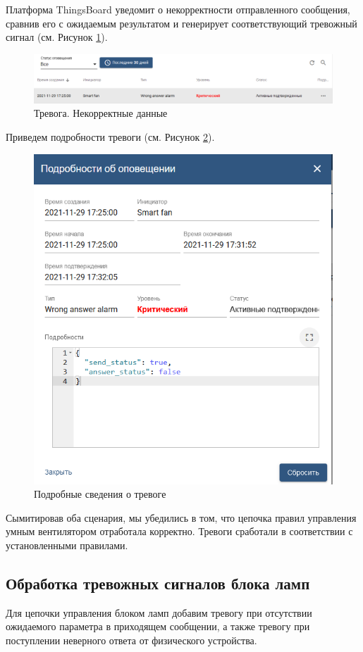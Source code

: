 \documentclass[a4paper,14pt]{extarticle}
\begin{document}
Платформа ThingsBoard уведомит о некорректности отправленного сообщения, сравнив его с ожидаемым результатом и генерирует соответствующий тревожный сигнал (см. Рисунок \ref{fig:alarm-wrong-response}).

\begin{figure}[h!]
	\centering
	\includegraphics[width=1\linewidth]{images/alarm-wrong-response}
	\caption{Тревога. Некорректные данные}
	\label{fig:alarm-wrong-response}
\end{figure}
\newpage
Приведем подробности тревоги (см. Рисунок \ref{fig:alarm-wrong-response-detail}).
\begin{figure}[h!]
	\centering
	\includegraphics[width=0.6\linewidth]{images/alarm-wrong-response-detail}
	\caption{Подробные сведения о тревоге}
	\label{fig:alarm-wrong-response-detail}
\end{figure}

Сымитировав оба сценария, мы убедились в том, что цепочка правил управления умным вентилятором отработала корректно. Тревоги сработали в соответствии с установленными правилами.

\subsection{Обработка тревожных сигналов блока ламп}

Для цепочки управления блоком ламп добавим тревогу при отсутствии ожидаемого параметра в приходящем сообщении, а также тревогу при поступлении неверного ответа от физического устройства.
\end{document}
